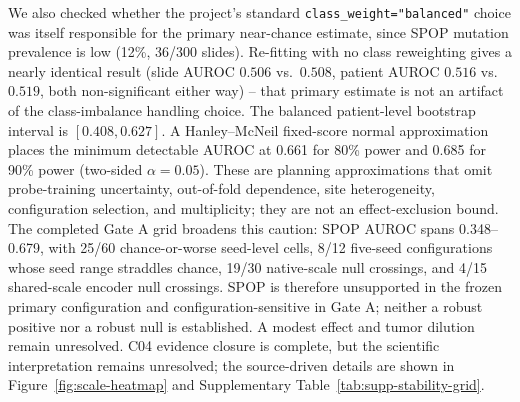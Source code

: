 We also checked whether the project's standard \texttt{class\_weight="balanced"} choice was itself
responsible for the primary near-chance estimate, since SPOP mutation prevalence is low (12\%, 36/300 slides).
Re-fitting with no class reweighting gives a nearly identical result (slide AUROC $0.506$ vs.\
$0.508$, patient AUROC $0.516$ vs.\ $0.519$, both non-significant either way) -- that primary
estimate is not an artifact of the class-imbalance handling choice. The balanced patient-level bootstrap
interval is $[0.408,0.627]$. A Hanley--McNeil fixed-score normal approximation places the
minimum detectable AUROC at 0.661 for 80\% power and 0.685 for 90\% power (two-sided
$\alpha=0.05$). These are planning approximations that omit probe-training uncertainty,
out-of-fold dependence, site heterogeneity, configuration selection, and multiplicity; they
are not an effect-exclusion bound. The completed Gate A grid broadens this caution: SPOP AUROC spans
0.348--0.679, with 25/60 chance-or-worse seed-level cells, 8/12 five-seed configurations whose
seed range straddles chance, 19/30 native-scale null crossings, and 4/15 shared-scale encoder
null crossings. SPOP is therefore unsupported in the frozen primary configuration and
configuration-sensitive in Gate A; neither a robust positive nor a robust null is established.
A modest effect and tumor dilution remain unresolved. C04 evidence closure is complete, but
the scientific interpretation remains unresolved; the source-driven details are shown in
Figure~\ref{fig:scale-heatmap} and Supplementary
Table~\ref{tab:supp-stability-grid}.
